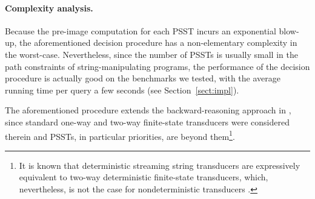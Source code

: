 \vspace{-2mm}
\paragraph*{Complexity analysis.} Because the pre-image computation for each PSST incurs an exponential blow-up, the aforementioned decision procedure has a non-elementary complexity in the worst-case. Nevertheless, since the number of PSSTs is usually small in the path constraints of string-manipulating programs, the performance of the decision procedure is actually good on the benchmarks we tested, with the average running time per query a few seconds (see Section~\ref{sect:impl}).

\vspace{-2mm}

\begin{remark}
The aforementioned procedure extends the backward-reasoning approach in \cite{CHL+19}, since standard one-way and two-way finite-state transducers were considered therein and PSSTs, in particular priorities, are beyond them\footnote{It is known that deterministic streaming string transducers are expressively equivalent to two-way deterministic finite-state transducers, which, nevertheless, is not the case for nondeterministic transducers \cite{AC10,AD11}.}. 
\end{remark}




